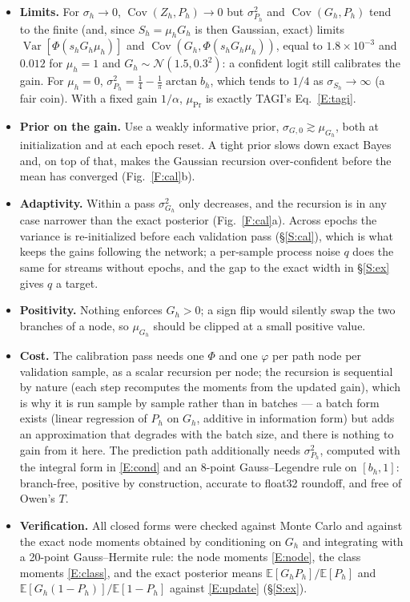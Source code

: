 \documentclass[letterpaper]{article}
\begin{document}
\begin{itemize}
\item \textbf{Limits.} For $\sigma_h\to0$, $\operatorname{Cov}(Z_h,P_h)\to0$ but $\sigma^2_{P_h}$ and $\operatorname{Cov}(G_h,P_h)$ tend to the finite (and, since $S_h=\mu_hG_h$ is then Gaussian, exact) limits $\operatorname{Var}[\Phi(s_hG_h\mu_h)]$ and $\operatorname{Cov}(G_h,\Phi(s_hG_h\mu_h))$, equal to $1.8\times10^{-3}$ and $0.012$ for $\mu_h=1$ and $G_h\sim\mathcal N(1.5,0.3^2)$: a confident logit still calibrates the gain. For $\mu_h=0$, $\sigma^2_{P_h}=\tfrac14-\tfrac1\pi\arctan b_h$, which tends to $1/4$ as $\sigma_{S_h}\to\infty$ (a fair coin). With a fixed gain $1/\alpha$, $\mu_{\Pr}$ is exactly TAGI's Eq.~\eqref{E:tagi}.
\item \textbf{Prior on the gain.} Use a weakly informative prior, $\sigma_{G,0}\gtrsim\mu_{G_h}$, both at initialization and at each epoch reset. A tight prior slows down exact Bayes and, on top of that, makes the Gaussian recursion over-confident before the mean has converged (Fig.~\ref{F:cal}b).
\item \textbf{Adaptivity.} Within a pass $\sigma^2_{G_h}$ only decreases, and the recursion is in any case narrower than the exact posterior (Fig.~\ref{F:cal}a). Across epochs the variance is re-initialized before each validation pass (\S\ref{S:cal}), which is what keeps the gains following the network; a per-sample process noise $q$ does the same for streams without epochs, and the gap to the exact width in \S\ref{S:ex} gives $q$ a target.
\item \textbf{Positivity.} Nothing enforces $G_h>0$; a sign flip would silently swap the two branches of a node, so $\mu_{G_h}$ should be clipped at a small positive value.
\item \textbf{Cost.} The calibration pass needs one $\Phi$ and one $\varphi$ per path node per validation sample, as a scalar recursion per node; the recursion is sequential by nature (each step recomputes the moments from the updated gain), which is why it is run sample by sample rather than in batches --- a batch form exists (linear regression of $P_h$ on $G_h$, additive in information form) but adds an approximation that degrades with the batch size, and there is nothing to gain from it here. The prediction path additionally needs $\sigma^2_{P_h}$, computed with the integral form in \eqref{E:cond} and an 8-point Gauss--Legendre rule on $[b_h,1]$: branch-free, positive by construction, accurate to float32 roundoff, and free of Owen's $T$.
\item \textbf{Verification.} All closed forms were checked against Monte Carlo and against the exact node moments obtained by conditioning on $G_h$ and integrating with a 20-point Gauss--Hermite rule: the node moments \eqref{E:node}, the class moments \eqref{E:class}, and the exact posterior means $\mathbb E[G_hP_h]/\mathbb E[P_h]$ and $\mathbb E[G_h(1-P_h)]/\mathbb E[1-P_h]$ against \eqref{E:update} (\S\ref{S:ex}).
\end{itemize}
\end{document}

